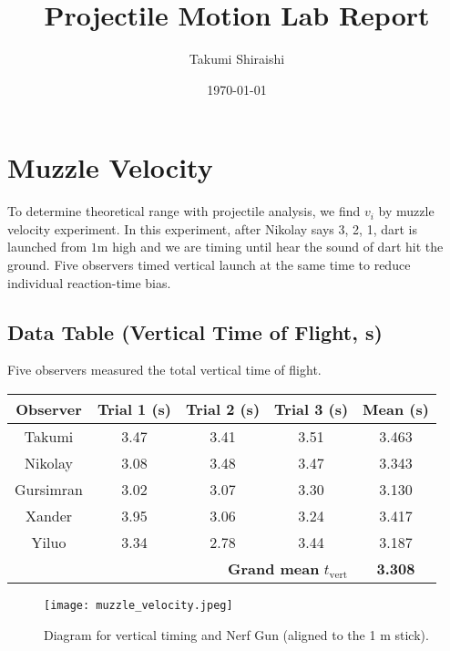 \documentclass[12pt]{article}
\begin{document}
\title{Projectile Motion Lab Report}
\author{Takumi Shiraishi}
\date{\today}
\maketitle

\tableofcontents
\vspace{1cm}


\newpage
\section{Muzzle Velocity}
To determine theoretical range with projectile analysis, we find $v_i$ by muzzle velocity experiment. In this experiment, after Nikolay says 3, 2, 1, dart is launched from $1\mathrm{m}$ high and we are timing until hear the sound of dart hit the ground.
Five observers timed vertical launch at the same time to reduce individual reaction-time bias.

\subsection{Data Table (Vertical Time of Flight, s)}
Five observers measured the total vertical time of flight.

\begin{center}
\begin{tabular}{|c|c|c|c|c|}
\hline
Observer & Trial 1 (s) & Trial 2 (s) & Trial 3 (s) & Mean (s)\\ \hline
Takumi & 3.47 & 3.41 & 3.51 & 3.463 \\ \hline
Nikolay & 3.08 & 3.48 & 3.47 & 3.343 \\ \hline
Gursimran & 3.02 & 3.07 & 3.30 & 3.130 \\ \hline
Xander & 3.95 & 3.06 & 3.24 & 3.417 \\ \hline
Yiluo & 3.34 & 2.78 & 3.44 & 3.187 \\ \hline
\multicolumn{4}{|r|}{\textbf{Grand mean} $ t_{\mathrm{vert}}$} & \textbf{3.308} \\ \hline
\end{tabular}
\end{center}

\begin{figure}[H]
  \centering
  \texttt{[image: muzzle\_velocity.jpeg]}
  \caption*{Diagram for vertical timing and Nerf Gun (aligned to the 1 m stick).}
\end{figure}
\end{document}
